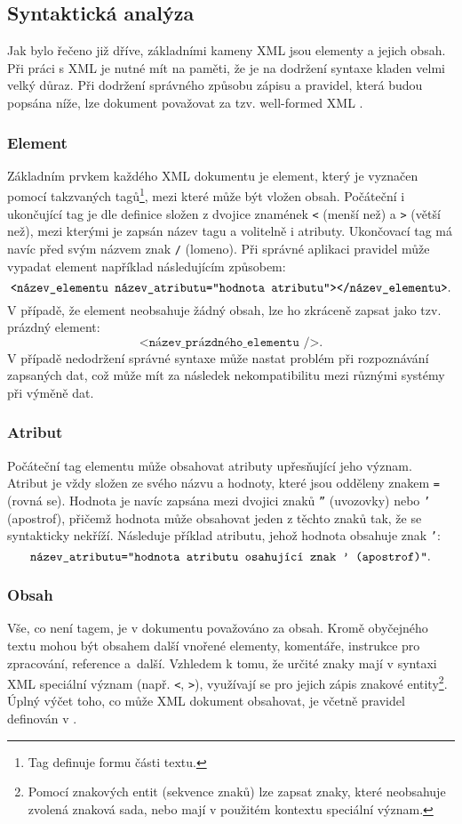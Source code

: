\subsection{Syntaktická analýza}
\label{syntaxeXml}
Jak bylo řečeno již dříve, základními kameny XML jsou elementy a jejich obsah. Při práci s XML je nutné mít na paměti, že je na dodržení syntaxe kladen velmi velký důraz. Při dodržení správného způsobu zápisu a pravidel, která budou popsána níže, lze dokument považovat za tzv. well-formed XML \cite{w3cxml}.

\subsubsection{Element}
Základním prvkem každého XML dokumentu je element, který je vyznačen pomocí takzvaných tagů\footnote{Tag definuje formu části textu.}, mezi které může být vložen obsah. Počáteční i ukončující tag je dle definice \cite{w3cxml} složen z dvojice znamének \texttt{<} (menší než) a \texttt{>} (větší než), mezi kterými je zapsán název tagu a volitelně i atributy. Ukončovací tag má navíc před svým názvem znak \texttt{/} (lomeno). Při správné aplikaci pravidel může vypadat element například následujícím způsobem:
$$\texttt{<název\_elementu název\_atributu=\textquotedblright hodnota atributu\textquotedblright></název\_elementu>}.$$
V případě, že element neobsahuje žádný obsah, lze ho zkráceně zapsat jako tzv. prázdný element:
$$\texttt{<název\_prázdného\_elementu />}.$$
V případě nedodržení správné syntaxe může nastat problém při rozpoznávání zapsaných dat, což může mít za následek nekompatibilitu mezi různými systémy při výměně dat.

\subsubsection{Atribut}
Počáteční tag elementu může obsahovat atributy upřesňující jeho význam. Atribut je vždy složen ze svého názvu a hodnoty, které jsou odděleny znakem \texttt{=} (rovná se). Hodnota je navíc zapsána mezi dvojici znaků \texttt{\textquotedblright} (uvozovky) nebo \texttt{\textquoteright} (apostrof), přičemž hodnota může obsahovat jeden z těchto znaků tak, že se syntakticky nekříží. Následuje příklad atributu, jehož hodnota obsahuje znak \texttt{\textquoteright}:
$$\texttt{název\_atributu=\textquotedblright hodnota atributu osahující znak \textquoteright\ (apostrof)\textquotedblright}.$$

\subsubsection{Obsah}
Vše, co není tagem, je v dokumentu považováno za obsah. Kromě obyčejného textu mohou být obsahem další vnořené elementy, komentáře, instrukce pro zpracování, reference a~další. Vzhledem k tomu, že určité znaky mají v syntaxi XML speciální význam (např. \texttt{<}, \texttt{>}), využívají se pro jejich zápis znakové entity\footnote{Pomocí znakových entit (sekvence znaků) lze zapsat znaky, které neobsahuje zvolená znaková sada, nebo mají v použitém kontextu speciální význam.}. Úplný výčet toho, co může XML dokument obsahovat, je včetně pravidel definován v \cite{w3cxml}.

